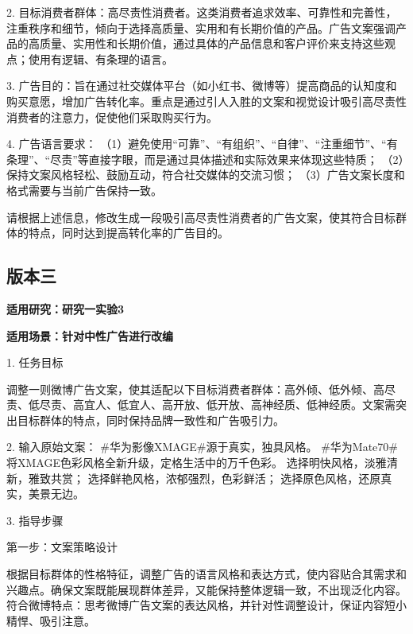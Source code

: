 2. 目标消费者群体：高尽责性消费者。这类消费者追求效率、可靠性和完善性，注重秩序和细节，倾向于选择高质量、实用和有长期价值的产品。广告文案强调产品的高质量、实用性和长期价值，通过具体的产品信息和客户评价来支持这些观点；使用有逻辑、有条理的语言。
\vspace{1\baselineskip} %

3. 广告目的：旨在通过社交媒体平台（如小红书、微博等）提高商品的认知度和购买意愿，增加广告转化率。重点是通过引人入胜的文案和视觉设计吸引高尽责性消费者的注意力，促使他们采取购买行为。
\vspace{1\baselineskip} %

4. 广告语言要求：
（1）避免使用“可靠”、“有组织”、“自律”、“注重细节”、“有条理”、“尽责”等直接字眼，而是通过具体描述和实际效果来体现这些特质；
（2）保持文案风格轻松、鼓励互动，符合社交媒体的交流习惯；
（3）广告文案长度和格式需要与当前广告保持一致。
\vspace{1\baselineskip} %

请根据上述信息，修改生成一段吸引高尽责性消费者的广告文案，使其符合目标群体的特点，同时达到提高转化率的广告目的。


\subsection*{版本三}

\textbf{适用研究：研究一实验3}

\textbf{适用场景：针对中性广告进行改编}

\vspace{1\baselineskip} %

1. 任务目标

调整一则微博广告文案，使其适配以下目标消费者群体：高外倾、低外倾、高尽责、低尽责、高宜人、低宜人、高开放、低开放、高神经质、低神经质。文案需突出目标群体的特点，同时保持品牌一致性和广告吸引力。
\vspace{1\baselineskip} %

2. 输入原始文案：
\#华为影像XMAGE\#源于真实，独具风格。  
\#华为Mate70\#将XMAGE色彩风格全新升级，定格生活中的万千色彩。  
选择明快风格，淡雅清新，雅致共赏；  
选择鲜艳风格，浓郁强烈，色彩鲜活；  
选择原色风格，还原真实，美景无边。 
\vspace{1\baselineskip} %


3. 指导步骤

第一步：文案策略设计

根据目标群体的性格特征，调整广告的语言风格和表达方式，使内容贴合其需求和兴趣点。确保文案既能展现群体差异，又能保持整体逻辑一致，不出现泛化内容。
符合微博特点：思考微博广告文案的表达风格，并针对性调整设计，保证内容短小精悍、吸引注意。

